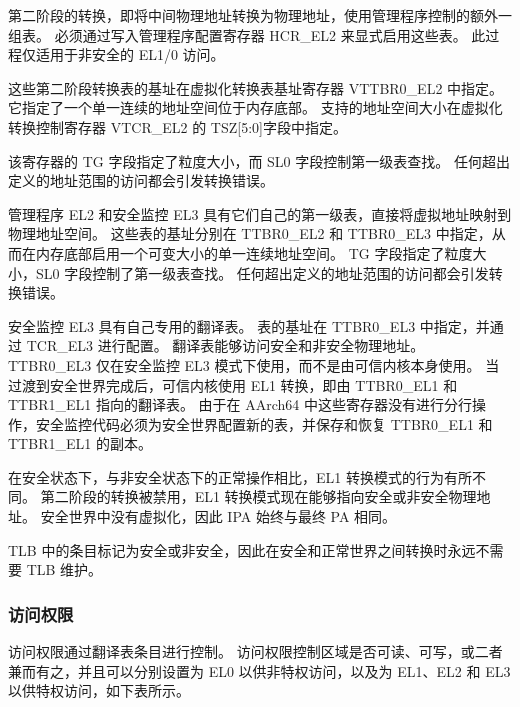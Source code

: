
第二阶段的转换，即将中间物理地址转换为物理地址，使用管理程序控制的额外一组表。
必须通过写入管理程序配置寄存器 HCR\_EL2 来显式启用这些表。
此过程仅适用于非安全的 EL1/0 访问。

这些第二阶段转换表的基址在虚拟化转换表基址寄存器 VTTBR0\_EL2 中指定。
它指定了一个单一连续的地址空间位于内存底部。
支持的地址空间大小在虚拟化转换控制寄存器 VTCR\_EL2 的 TSZ{[}5:0{]}字段中指定。

该寄存器的 TG 字段指定了粒度大小，而 SL0 字段控制第一级表查找。
任何超出定义的地址范围的访问都会引发转换错误。


管理程序 EL2 和安全监控 EL3 具有它们自己的第一级表，直接将虚拟地址映射到物理地址空间。
这些表的基址分别在 TTBR0\_EL2 和 TTBR0\_EL3 中指定，从而在内存底部启用一个可变大小的单一连续地址空间。
TG 字段指定了粒度大小，SL0 字段控制了第一级表查找。
任何超出定义的地址范围的访问都会引发转换错误。


安全监控 EL3 具有自己专用的翻译表。
表的基址在 TTBR0\_EL3 中指定，并通过 TCR\_EL3 进行配置。
翻译表能够访问安全和非安全物理地址。
TTBR0\_EL3 仅在安全监控 EL3 模式下使用，而不是由可信内核本身使用。
当过渡到安全世界完成后，可信内核使用 EL1 转换，即由 TTBR0\_EL1 和 TTBR1\_EL1 指向的翻译表。
由于在 AArch64 中这些寄存器没有进行分行操作，安全监控代码必须为安全世界配置新的表，并保存和恢复 TTBR0\_EL1 和 TTBR1\_EL1 的副本。

在安全状态下，与非安全状态下的正常操作相比，EL1 转换模式的行为有所不同。
第二阶段的转换被禁用，EL1 转换模式现在能够指向安全或非安全物理地址。
安全世界中没有虚拟化，因此 IPA 始终与最终 PA 相同。

TLB 中的条目标记为安全或非安全，因此在安全和正常世界之间转换时永远不需要 TLB 维护。

\subsubsection{访问权限}

访问权限通过翻译表条目进行控制。
访问权限控制区域是否可读、可写，或二者兼而有之，并且可以分别设置为 EL0 以供非特权访问，以及为 EL1、EL2 和 EL3 以供特权访问，如下表所示。

